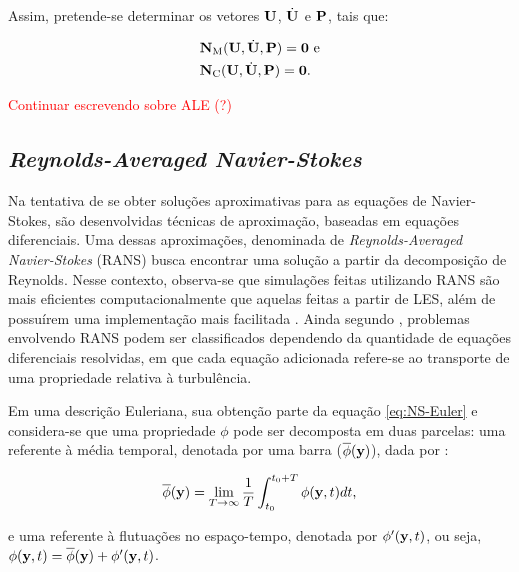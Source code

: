\documentclass[_ArquivoPrincipal.tex]{subfiles}
\begin{document}
Assim, pretende-se determinar os vetores $\mathbf{U}$, $\dot{\mathbf{U}}$ e $\mathbf{P}$, tais que:

\begin{subequations}
    \begin{align}
        &\mathbf{N}_\mathrm{M}(\mathbf{U},\dot{\mathbf{U}},\mathbf{P})=\mathbf{0}\text{ e}\\
        &\mathbf{N}_\mathrm{C}(\mathbf{U},\dot{\mathbf{U}},\mathbf{P})=\mathbf{0}\text{.}        
    \end{align}
\end{subequations}

\textcolor{red}{Continuar escrevendo sobre ALE (?)}

\subsection{\textit{Reynolds-Averaged Navier-Stokes}} \label{RANS}

Na tentativa de se obter soluções aproximativas para as equações de Navier-Stokes, são desenvolvidas técnicas de aproximação, baseadas em equações diferenciais. Uma dessas aproximações, denominada de \textit{Reynolds-Averaged Navier-Stokes} (RANS) busca encontrar uma solução a partir da decomposição de Reynolds. Nesse contexto, observa-se que simulações feitas utilizando RANS são mais eficientes computacionalmente que aquelas feitas a partir de LES, além de possuírem uma implementação mais facilitada \cite{alfonsi2009reynolds, ling2015evaluation}. Ainda segundo , problemas envolvendo RANS podem ser classificados dependendo da quantidade de equações diferenciais resolvidas, em que cada equação adicionada refere-se ao transporte de uma propriedade relativa à turbulência.

Em uma descrição Euleriana, sua obtenção parte da equação \ref{eq:NS-Euler} e considera-se que uma propriedade $\phi$ pode ser decomposta em duas parcelas: uma referente à média temporal, denotada por uma barra ($\overline{\phi}(\mathbf{y})$), dada por \cite{tennekes1972first,speziale1991analytical}:

\begin{equation}
    \overline{\phi}(\mathbf{y})=\lim_{T\to\infty}{\frac{1}{T}\int_{t_0}^{t_0+T}{\phi(\mathbf{y},t)dt}}\text{,}
\end{equation}

\noindent e uma referente à flutuações no espaço-tempo, denotada por $\phi'(\mathbf{y},t)$, ou seja, $\phi(\mathbf{y},t)=\overline{\phi}(\mathbf{y})+\phi'(\mathbf{y},t)$.
\end{document}
